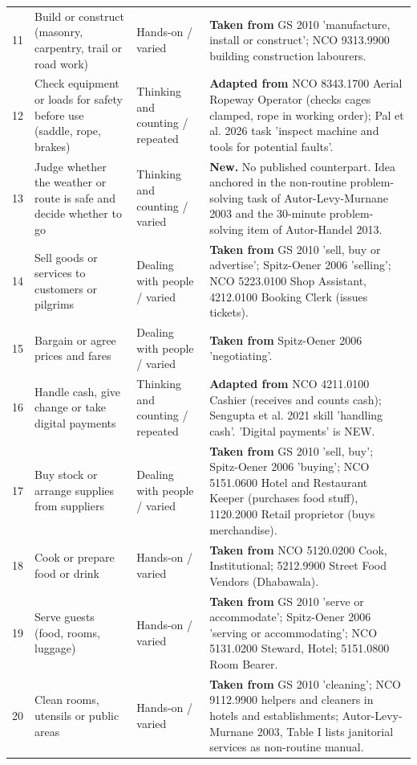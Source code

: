 \documentclass[11pt]{article}
\begin{document}
{\begin{longtable}{p{0.7cm}p{4.2cm}p{2.7cm}p{6.9cm}}
11 & Build or construct (masonry, carpentry, trail or road work) & Hands-on / varied & \textbf{Taken from} GS 2010 'manufacture, install or construct'; NCO 9313.9900 building construction labourers. \\
12 & Check equipment or loads for safety before use (saddle, rope, brakes) & Thinking and counting / repeated & \textbf{Adapted from} NCO 8343.1700 Aerial Ropeway Operator (checks cages clamped, rope in working order); Pal et al. 2026 task 'inspect machine and tools for potential faults'. \\
13 & Judge whether the weather or route is safe and decide whether to go & Thinking and counting / varied & \textbf{New.} No published counterpart. Idea anchored in the non-routine problem-solving task of Autor-Levy-Murnane 2003 and the 30-minute problem-solving item of Autor-Handel 2013. \\
14 & Sell goods or services to customers or pilgrims & Dealing with people / varied & \textbf{Taken from} GS 2010 'sell, buy or advertise'; Spitz-Oener 2006 'selling'; NCO 5223.0100 Shop Assistant, 4212.0100 Booking Clerk (issues tickets). \\
15 & Bargain or agree prices and fares & Dealing with people / varied & \textbf{Taken from} Spitz-Oener 2006 'negotiating'. \\
16 & Handle cash, give change or take digital payments & Thinking and counting / repeated & \textbf{Adapted from} NCO 4211.0100 Cashier (receives and counts cash); Sengupta et al. 2021 skill 'handling cash'. 'Digital payments' is NEW. \\
17 & Buy stock or arrange supplies from suppliers & Dealing with people / varied & \textbf{Taken from} GS 2010 'sell, buy'; Spitz-Oener 2006 'buying'; NCO 5151.0600 Hotel and Restaurant Keeper (purchases food stuff), 1120.2000 Retail proprietor (buys merchandise). \\
18 & Cook or prepare food or drink & Hands-on / varied & \textbf{Taken from} NCO 5120.0200 Cook, Institutional; 5212.9900 Street Food Vendors (Dhabawala). \\
19 & Serve guests (food, rooms, luggage) & Hands-on / varied & \textbf{Taken from} GS 2010 'serve or accommodate'; Spitz-Oener 2006 'serving or accommodating'; NCO 5131.0200 Steward, Hotel; 5151.0800 Room Bearer. \\
20 & Clean rooms, utensils or public areas & Hands-on / varied & \textbf{Taken from} GS 2010 'cleaning'; NCO 9112.9900 helpers and cleaners in hotels and establishments; Autor-Levy-Murnane 2003, Table I lists janitorial services as non-routine manual. \\

\end{longtable}}
\end{document}
